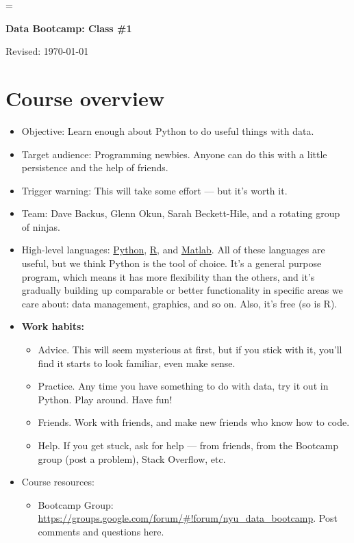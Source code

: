 \documentclass[11pt]{article}
\begin{document}
\parskip=\bigskipamount
\parindent=0.0in
\thispagestyle{empty}


\bigskip\bigskip
\centerline{\Large \bf Data Bootcamp:  Class \#1}
\centerline{Revised: \today}


\section{Course overview}

\begin{itemize}
\item Objective:  Learn enough about Python to do useful things with data.
\item Target audience:  Programming newbies.
Anyone can do this with a little persistence and the help of friends.
\item Trigger warning:  This will take some effort ---  but it's worth it.
\item Team:  Dave Backus, Glenn Okun, Sarah Beckett-Hile, and a rotating group of ninjas.

\item High-level languages:
\href{http://en.wikipedia.org/wiki/Python_(programming_language)}{Python},
\href{http://en.wikipedia.org/wiki/R_(programming_language)}{R},
and
\href{http://en.wikipedia.org/wiki/MATLAB}{Matlab}.
All of these languages are useful, but we think Python is the tool of choice.
It's a general purpose program, which means it has more flexibility than the others,
and it's gradually building up comparable or better functionality in specific areas we care about:
data management, graphics, and so on.
Also, it's free (so is R).  


\item {\bf Work habits:}
\begin{itemize}
\item Advice.  This will seem mysterious at first, but if you stick with it,
you'll find it starts to look familiar, even make sense.
\item Practice.  Any time you have something to do with data, try it out in Python.
Play around.  Have fun!
\item Friends.  Work with friends, and make new friends who know how to code.
\item Help.  If you get stuck, ask for help --- from friends,
from the Bootcamp group (post a problem), Stack Overflow, etc.
\end{itemize}

\item Course resources:
\begin{itemize}
\item Bootcamp Group:  \url{https://groups.google.com/forum/#!forum/nyu_data_bootcamp}.
Post comments and questions here.  


\end{itemize}
\end{itemize}
\end{document}
